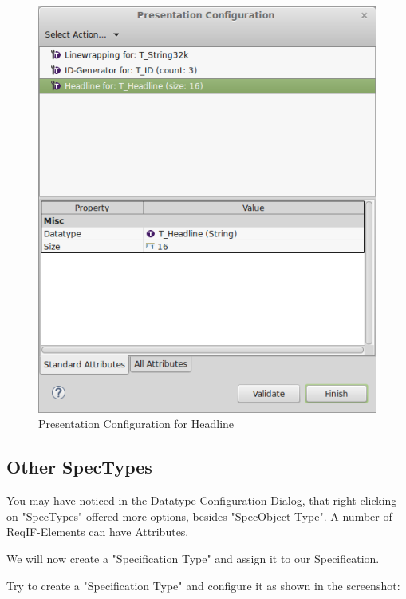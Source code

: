 \begin{figure}[h!]
\centering      
\includegraphics[width=0.8\linewidth]{../rmf-images/Presentation_headline.png}      
\caption{Presentation Configuration for Headline}      
\label{fig:headlineConfig2}
\end{figure}

\subsection{Other SpecTypes}

You may have noticed in the Datatype Configuration Dialog, that right-clicking on "SpecTypes" offered more options, besides "SpecObject Type".  A number of ReqIF-Elements can have Attributes.

We will now create a "Specification Type" and assign it to our Specification.

Try to create a "Specification Type" and configure it as shown in the screenshot:


